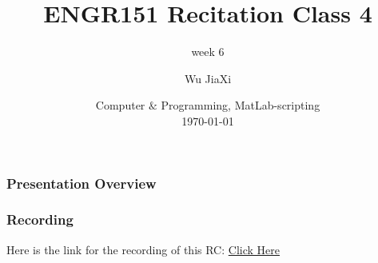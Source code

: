 \documentclass[
	11pt, %
]{beamer}
\title[Computer \& Programming, MATLAB]{ENGR151 Recitation Class 4} %
\subtitle{week 6} %
\author[Wu JiaXi]{Wu JiaXi} %
\institute[UM-SJTU joint institute]{UM-SJTU joint institute \\ \smallskip \textit{nina$\_$nhk@sjtu.edu.cn}} %
\date[\today]{Computer $\&$ Programming, MatLab-scripting \\ \today} %
\begin{document}

\begin{frame}
	\titlepage %
\end{frame}



\begin{frame}
	\frametitle{Presentation Overview} %
	
	\tableofcontents %
\end{frame}


\begin{frame}
	\frametitle{Recording} %
	
	Here is the link for the recording of this RC: \href{https://sjtu.feishu.cn/file/QFJybWCJ2oXiI7xZpuzcKyWPnsg?from=from_copylink}{Click Here}
\end{frame}
\end{document}

